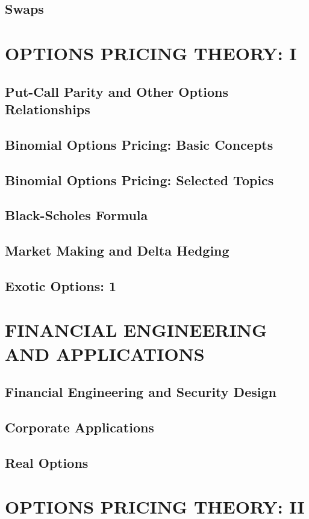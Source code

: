 \documentclass{book}
\theoremstyle{definition}
\theoremstyle{remark}
\begin{document}
\section{Swaps}

\newpage
\chapter{OPTIONS PRICING THEORY: I}
\section{Put-Call Parity and Other Options Relationships}
\section{Binomial Options Pricing: Basic Concepts}
\section{Binomial Options Pricing: Selected Topics}
\section{Black-Scholes Formula}
\section{Market Making and Delta Hedging}
\section{Exotic Options: 1}

\newpage
\chapter{FINANCIAL ENGINEERING AND APPLICATIONS}
\section{Financial Engineering and Security Design}
\section{Corporate Applications}
\section{Real Options}

\newpage
\chapter{OPTIONS PRICING THEORY: II}
\end{document}
